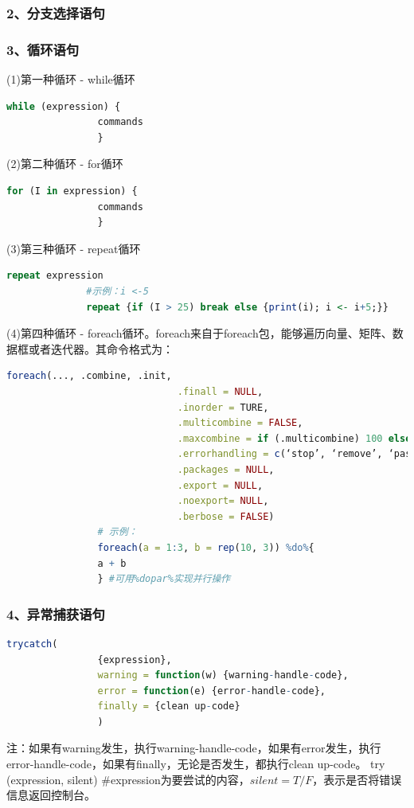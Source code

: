         \subsubsection{2、分支选择语句}
        \subsubsection{3、循环语句}
            \par
            (1)第一种循环 - while循环
                \begin{lstlisting}[language=R]
              while (expression) {
                commands
                }
                \end{lstlisting}
            \par
            (2)第二种循环 - for循环
                \begin{lstlisting}[language=R]
                for (I in expression) {
                commands
                }
                \end{lstlisting}
            \par
            (3)第三种循环 - repeat循环
              \begin{lstlisting}[language=R]
              repeat expression
              #示例：i <-5
              repeat {if (I > 25) break else {print(i); i <- i+5;}}
              \end{lstlisting}
            \par
            (4)第四种循环 - foreach循环。foreach来自于foreach包，能够遍历向量、矩阵、数据框或者迭代器。其命令格式为：
                \begin{lstlisting}[language=R]
                foreach(..., .combine, .init,
                              .finall = NULL,
                              .inorder = TURE,
                              .multicombine = FALSE,
                              .maxcombine = if (.multicombine) 100 else 2,
                              .errorhandling = c(‘stop’, ‘remove’, ‘pass’),
                              .packages = NULL,
                              .export = NULL,
                              .noexport= NULL,
                              .berbose = FALSE)
                # 示例：
                foreach(a = 1:3, b = rep(10, 3)) %do%{
                a + b
                } #可用%dopar%实现并行操作
                \end{lstlisting}
        \subsubsection{4、异常捕获语句}
                \begin{lstlisting}[language=R]
                trycatch(
                {expression},
                warning = function(w) {warning-handle-code},
                error = function(e) {error-handle-code},
                finally = {clean up-code}
                )
                \end{lstlisting}
            注：如果有warning发生，执行warning-handle-code，如果有error发生，执行error-handle-code，如果有finally，无论是否发生，都执行clean up-code。
            try (expression, silent) \#expression为要尝试的内容，$silent = T/F$，表示是否将错误信息返回控制台。
